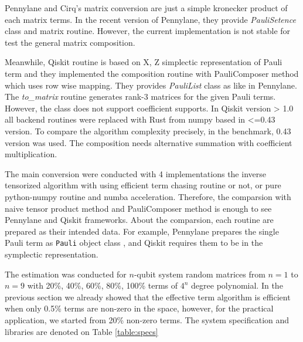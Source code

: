 \documentclass[twocolumn]{article}
\begin{document}
Pennylane and Cirq's matrix conversion are just a simple kronecker product of each matrix terms.
In the recent version of Pennylane, they provide \textit{PauliSetence} class and matrix routine.
However, the current implementation is not stable for test the general matrix composition.%

Meanwhile, Qiskit routine is based on X, Z simplectic representation of Pauli term 
and they implemented the composition routine with PauliComposer method 
which uses row wise mapping.
They provides \textit{PauliList} class as like in Pennylane. 
The \textit{to\_matrix} routine generates rank-3 matrices for the given Pauli terms.
However, the class does not support coefficient supports.
In Qiskit version > 1.0 all backend routines were replaced with Rust from numpy based in <=0.43 version.
To compare the algorithm complexity precisely, in the benchmark, 0.43 version was used. 
The composition needs alternative summation with coefficient multiplication.

The main conversion were conducted with 4 implementations the inverse tensorized algorithm
with using efficient term chasing routine or not, or pure python-numpy routine and numba acceleration.
Therefore, the comparsion with naive tensor product method and PauliComposer method
is enough to see Pennylane and Qiskit frameworks. 
About the comparsion, each routine are prepared as their intended 
data. For example, Pennylane prepares the single Pauli term as \texttt{Pauli} object class
, and Qiskit requires them to be in the symplectic representation.

The estimation was conducted for $n$-qubit system random matrices from $n=1$ to $n=9$
with 20\%, 40\%, 60\%, 80\%, 100\% terms of $4^n$ degree polynomial.
In the previous section we already showed that the effective term algorithm is 
efficient when only 0.5\% terms are non-zero in the space, however,
for the practical application, we started from 20\% non-zero terms. 
The system specification and libraries are denoted on Table \ref{table:specs}
\end{document}
